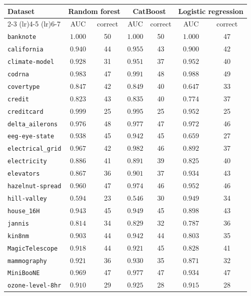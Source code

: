 \centering\scriptsize\begin{tabular}{@{}lcccccc@{}}\toprule
Dataset & \multicolumn{2}{c}{Random forest} & \multicolumn{2}{c}{CatBoost} & \multicolumn{2}{c}{Logistic regression} \\ \cmidrule(lr){2-3} \cmidrule(lr){4-5} \cmidrule(lr){6-7}
 & AUC & correct & AUC & correct & AUC & correct \\ \midrule
\texttt{banknote} & $1.000$ & 50 & $1.000$ & 50 & $1.000$ & 47 \\
\texttt{california} & $0.940$ & 44 & $0.955$ & 43 & $0.900$ & 42 \\
\texttt{climate-model} & $0.928$ & 31 & $0.951$ & 37 & $0.952$ & 40 \\
\texttt{codrna} & $0.983$ & 47 & $0.991$ & 48 & $0.988$ & 49 \\
\texttt{covertype} & $0.847$ & 42 & $0.849$ & 40 & $0.647$ & 33 \\
\texttt{credit} & $0.823$ & 43 & $0.835$ & 40 & $0.774$ & 37 \\
\texttt{creditcard} & $0.999$ & 25 & $0.995$ & 25 & $0.952$ & 25 \\
\texttt{delta\_ailerons} & $0.976$ & 48 & $0.977$ & 47 & $0.972$ & 46 \\
\texttt{eeg-eye-state} & $0.938$ & 45 & $0.942$ & 45 & $0.659$ & 27 \\
\texttt{electrical\_grid} & $0.967$ & 42 & $0.982$ & 46 & $0.892$ & 37 \\
\texttt{electricity} & $0.886$ & 41 & $0.891$ & 39 & $0.825$ & 40 \\
\texttt{elevators} & $0.867$ & 36 & $0.901$ & 37 & $0.934$ & 43 \\
\texttt{hazelnut-spread} & $0.960$ & 47 & $0.974$ & 46 & $0.952$ & 46 \\
\texttt{hill-valley} & $0.594$ & 23 & $0.546$ & 30 & $0.949$ & 34 \\
\texttt{house\_16H} & $0.943$ & 45 & $0.949$ & 45 & $0.898$ & 43 \\
\texttt{jannis} & $0.814$ & 34 & $0.829$ & 32 & $0.787$ & 36 \\
\texttt{kin8nm} & $0.903$ & 44 & $0.942$ & 44 & $0.803$ & 35 \\
\texttt{MagicTelescope} & $0.918$ & 44 & $0.921$ & 45 & $0.828$ & 41 \\
\texttt{mammography} & $0.921$ & 36 & $0.930$ & 35 & $0.871$ & 32 \\
\texttt{MiniBooNE} & $0.969$ & 47 & $0.977$ & 47 & $0.934$ & 47 \\
\texttt{ozone-level-8hr} & $0.910$ & 29 & $0.925$ & 28 & $0.915$ & 28 \\

\end{tabular}
